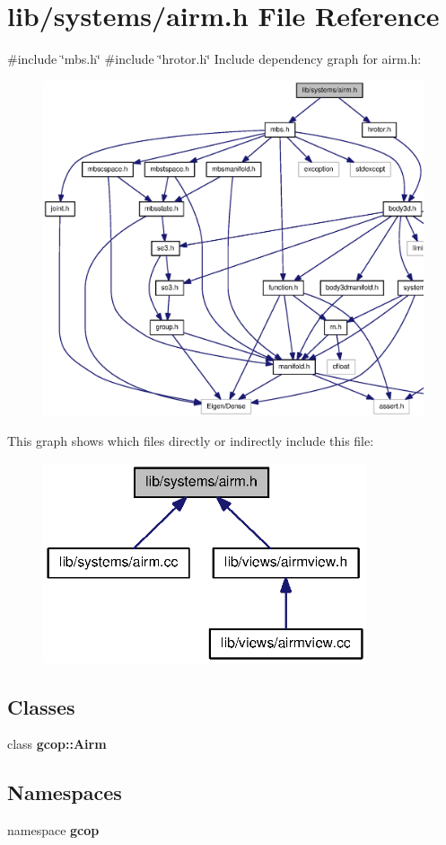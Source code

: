 \section{lib/systems/airm.h \-File \-Reference}
\label{airm_8h}
{\ttfamily \#include \char`\"{}mbs.\-h\char`\"{}}\*
{\ttfamily \#include \char`\"{}hrotor.\-h\char`\"{}}\*
\-Include dependency graph for airm.\-h\-:
\nopagebreak
\begin{figure}[H]
\begin{center}
\leavevmode
\includegraphics[width=350pt]{airm_8h__incl}
\end{center}
\end{figure}
\-This graph shows which files directly or indirectly include this file\-:
\nopagebreak
\begin{figure}[H]
\begin{center}
\leavevmode
\includegraphics[width=271pt]{airm_8h__dep__incl}
\end{center}
\end{figure}
\subsection*{\-Classes}
\begin{DoxyCompactItemize}
\item 
class {\bf gcop\-::\-Airm}
\end{DoxyCompactItemize}
\subsection*{\-Namespaces}
\begin{DoxyCompactItemize}
\item 
namespace {\bf gcop}
\end{DoxyCompactItemize}
